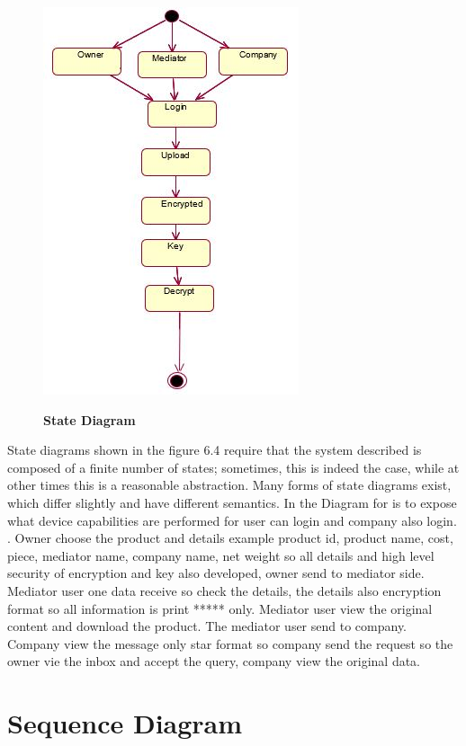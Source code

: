 \documentclass[BTech]{srmuthesis}
\begin{document}
\begin{figure}[H]
\centering
\includegraphics[scale=0.8]{State.jpg}
\label{fig:1}\hspace{10mm}
\caption{\textbf{State Diagram}}
\end{figure}
State diagrams shown in the figure 6.4 require that the system described is composed of a finite number of states; sometimes, this is indeed the case, while at other times this is a reasonable abstraction. Many forms of state diagrams exist, which differ slightly and have different semantics. In the Diagram for is to expose what device capabilities are performed for user can login and company also login. .     Owner choose the product and details example product id, product name, cost, piece, mediator name, company name, net weight so all details and high level security of encryption and key also developed,  owner  send to mediator side. Mediator user one data receive so check the details, the details also encryption format so all information is print ***** only. Mediator user view the original content and download the product. The mediator user send to company. Company view the message only star format so company send the request so the owner vie the inbox and accept the query, company view the original data.
\section{Sequence Diagram}
\end{document}
